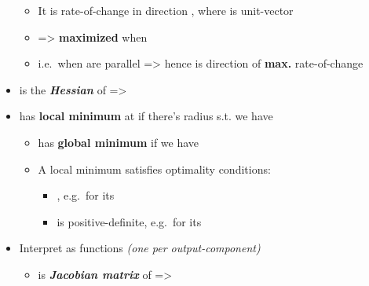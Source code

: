 \begin{itemize}
  \begin{itemize}
  
  \item
    It is rate-of-change in direction , where
     is unit-vector
  \item
    =\textgreater{} 
    \textbf{maximized} when 
  \item
    i.e.~when  are parallel =\textgreater{}
    hence  is direction of \textbf{max.}
    rate-of-change
  \end{itemize}
\item
   is
  the \textbf{\emph{Hessian}} of  =\textgreater{}
\item
   has \textbf{local minimum} at
   if there's radius 
  s.t.  we
  have 

  \begin{itemize}
  
  \item
     has \textbf{global minimum}
     if
     we have
  \item
    A local minimum satisfies optimality conditions:

    \begin{itemize}
    
    \item
      , e.g.~for 
      its 
    \item
       is positive-definite, e.g.~for
       its 
    \end{itemize}
  \end{itemize}
\item
  Interpret  as 
  functions  \emph{(one
  per output-component)}

  \begin{itemize}
  
  \item
    is \textbf{\emph{Jacobian matrix}} of  =\textgreater{}
  \end{itemize}
\end{itemize}

